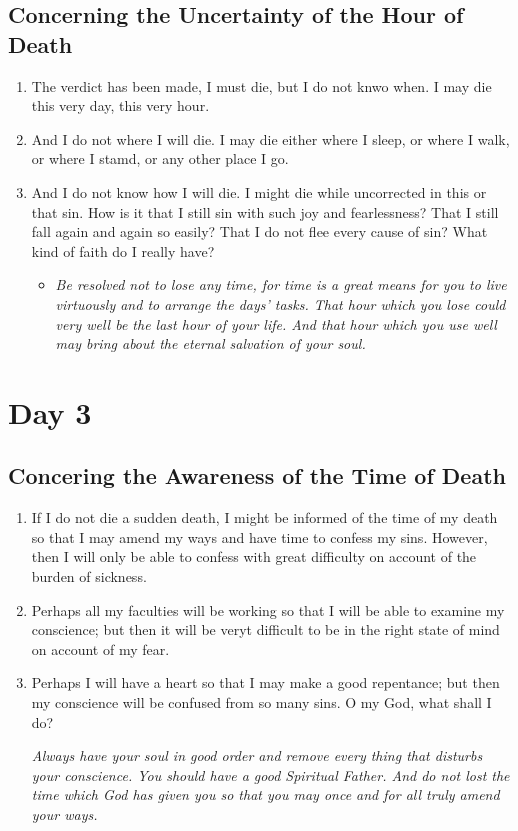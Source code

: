 \documentclass[11pt]{article}
\begin{document}
\subsection*{Concerning the Uncertainty of the Hour of Death}
\label{sec:orgb4e288d}
\begin{enumerate}
\item The verdict has been made, I must die, but I do not knwo when. I may die this very day, this very hour.
\item And I do not where I will die. I may die either where I sleep, or where I walk, or where I stamd, or any other place I go.
\item And I do not know how I will die. I might die while uncorrected in this or that sin. How is it that I still sin with such
joy and fearlessness? That I still fall again and again so easily? That I do not flee every cause of sin? What kind of faith do I really have?

\begin{itemize}
\item \emph{Be resolved not to lose any time, for time is a great means for you to live virtuously and to arrange the days' tasks. That hour which you
lose could very well be the last hour of your life. And that hour which you use well may bring about the eternal salvation of your soul.}
\end{itemize}
\end{enumerate}
\section*{Day 3}
\label{sec:org7c74d72}
\subsection*{Concering the Awareness of the Time of Death}
\label{sec:orga69cefd}
\begin{enumerate}
\item If I do not die a sudden death, I might be informed of the time of my death so that I may amend my ways and have time to confess my sins.
However, then I will only be able to confess with great difficulty on account of the burden of sickness.
\item Perhaps all my faculties will be working so that I will be able to examine my conscience; but then it will be veryt difficult to be in the
right state of mind on account of my fear.
\item Perhaps I will have a heart so that I may make a good repentance; but then my conscience will be confused from so many sins. O my God, what shall I do?

\emph{Always have your soul in good order and remove every thing that disturbs your conscience. You should have a good Spiritual Father. And do not lost the
time which God has given you so that you may once and for all truly amend your ways.}
\end{enumerate}
\end{document}
